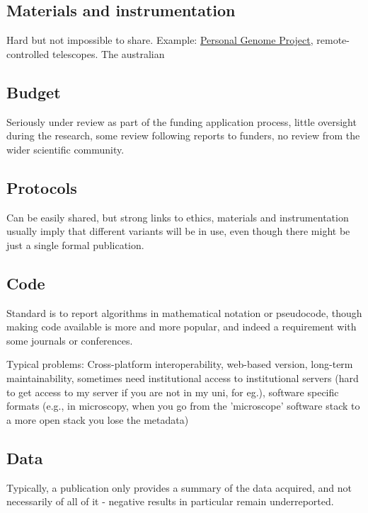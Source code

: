 \documentclass[final,authoryear,3p]{elsarticle-open-drafting}
\begin{document}
\subsection{Materials and instrumentation}
Hard but not impossible to share. Example: \href{http://www.personalgenomes.org/}{Personal Genome Project}, remote-controlled telescopes. The australian 

\subsection{Budget}
Seriously under review as part of the funding application process, little oversight during the research, some review following reports to funders, no review from the wider scientific community. 

\subsection{Protocols}
Can be easily shared, but strong links to ethics, materials and instrumentation usually imply that different variants will be in use, even though there might be just a single formal publication.
 
\subsection{Code}
Standard is to report algorithms in mathematical notation or pseudocode, though making code available is more and more popular, and indeed a requirement with some journals or conferences.

Typical problems: Cross-platform interoperability, web-based version, long-term maintainability, sometimes need institutional access to institutional servers (hard to get access to my server if you are not in my uni, for eg.), software specific formats (e.g., in microscopy, when you go from the 'microscope' software stack to a more open stack you lose the metadata)

\subsection{Data}
Typically, a publication only provides a summary of the data acquired, and not necessarily of all of it - negative results
in particular remain underreported.
\end{document}
